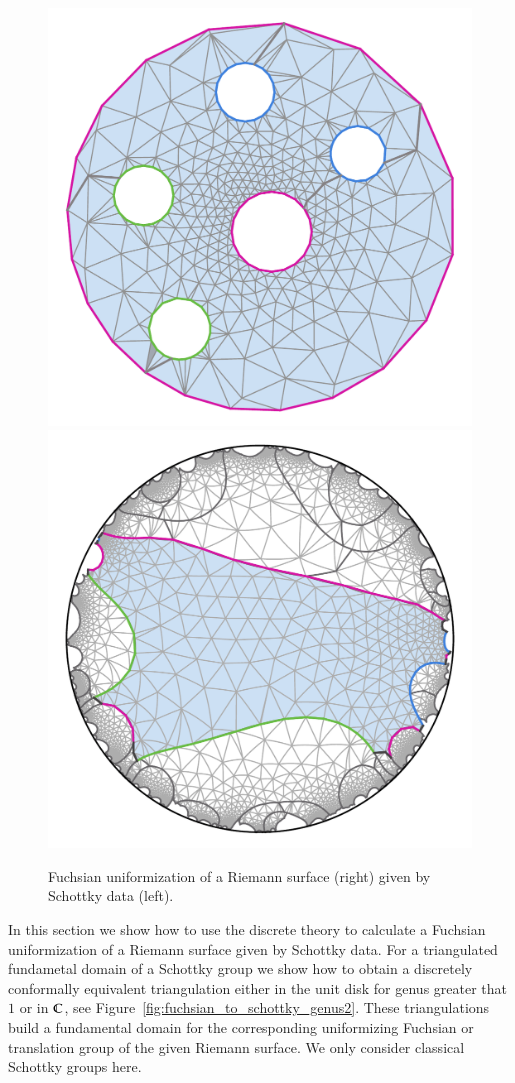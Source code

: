 \documentclass[Thesis.tex]{subfiles}
\begin{document}
\begin{figure}
	\centering
	\includegraphics[width=0.45\linewidth]{data/schottky_g3/genus3_image2}
	\includegraphics[width=0.45\linewidth]{data/schottky_g3/genus3_domain2}
	\caption{Fuchsian uniformization of a Riemann surface (right) given by Schottky data (left).}
	\label{fig:fuchsian_to_schottky_genus3}
\end{figure}

In this section we show how to use the discrete theory to calculate a Fuchsian uniformization of a Riemann surface 
given by Schottky data. For a triangulated fundametal domain of a Schottky group we show how to obtain a discretely
conformally equivalent triangulation either in the unit disk for genus greater that $1$ or in $\mathbb C$, see Figure~\ref{fig:fuchsian_to_schottky_genus2}. These triangulations build
a fundamental domain for the corresponding uniformizing Fuchsian or translation group of the given Riemann surface. We only consider classical Schottky groups here.
\end{document}
